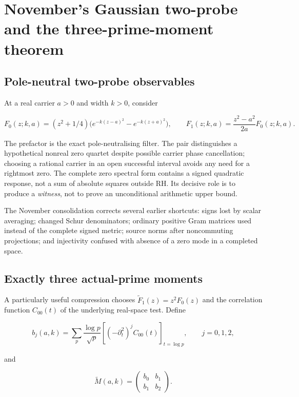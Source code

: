 \documentclass[
  10pt,
  a4paper,
  10pt,
  oneside,
  openany]{book}
\begin{document}
\section{November's Gaussian two-probe and the three-prime-moment
theorem}\label{novembers-gaussian-two-probe-and-the-three-prime-moment-theorem}

\subsection{Pole-neutral two-probe
observables}\label{pole-neutral-two-probe-observables}

At a real carrier \(a>0\) and width \(k>0\), consider

\[
F_0(z;k,a)=(z^2+1/4)
\bigl(e^{-k(z-a)^2}-e^{-k(z+a)^2}\bigr),
\qquad F_1(z;k,a)=\frac{z^2-a^2}{2a}F_0(z;k,a).
\tag{S8.1}\label{eq:S8.1}
\]

The prefactor is the exact pole-neutralising filter. The pair
distinguishes a hypothetical nonreal zero quartet despite possible
carrier phase cancellation; choosing a rational carrier in an open
successful interval avoids any need for a rightmost zero. The complete
zero spectral form contains a signed quadratic response, not a sum of
absolute squares outside RH. Its decisive role is to produce a
\emph{witness}, not to prove an unconditional arithmetic upper bound.

The November consolidation corrects several earlier shortcuts: signs
lost by scalar averaging; changed Schur denominators; ordinary positive
Gram matrices used instead of the complete signed metric; source norms
after noncommuting projections; and injectivity confused with absence of
a zero mode in a completed space.

\subsection{Exactly three actual-prime
moments}\label{exactly-three-actual-prime-moments}

A particularly useful compression chooses
\(\widetilde F_1(z)=z^2F_0(z)\) and the correlation function
\(C_{00}(t)\) of the underlying real-space test. Define

\[
b_j(a,k)=\sum_{p}\frac{\log p}{\sqrt p}
\left[(-\partial_t^2)^j C_{00}(t)\right]_{t=\log p},
\qquad j=0,1,2,
\tag{S8.2}\label{eq:S8.2}
\]

and

\[
\widetilde M(a,k)=\begin{pmatrix}b_0&b_1\\b_1&b_2\end{pmatrix}.
\tag{S8.3}\label{eq:S8.3}
\]
\end{document}
